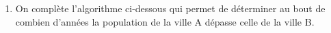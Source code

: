 \begin{enumerate}
\item On complète l'algorithme ci-dessous qui permet de déterminer au bout de combien d'années la population de la ville A dépasse celle de la ville B.

\begin{center}
\renewcommand{\arraystretch}{1.2}
\end{center}
\end{enumerate}

\bigskip
